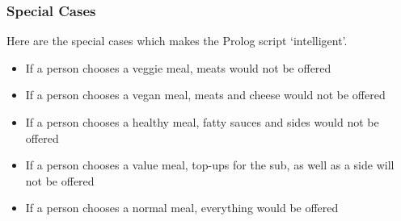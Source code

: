 \documentclass{article}
\begin{document}
\subsubsection*{Special Cases}

Here are the special cases which makes the Prolog script `intelligent'.

\begin{itemize}
\item If a person chooses a veggie meal, meats would not be offered
\item If a person chooses a vegan meal, meats and cheese would not be offered
\item If a person chooses a healthy meal, fatty sauces and sides would not be offered
\item If a person chooses a value meal, top-ups for the sub, as well as a side will not be offered
\item If a person chooses a normal meal, everything would be offered
\end{itemize}
\end{document}
